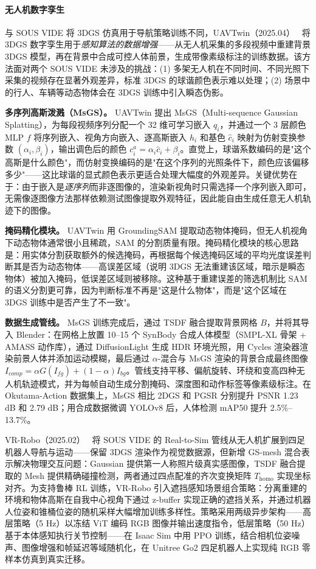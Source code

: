 \paragraph{无人机数字孪生}

与 SOUS VIDE 将 3DGS 仿真用于导航策略训练不同，UAVTwin（2025.04）~\cite{2504_02158} 将 3DGS 数字孪生用于\emph{感知算法的数据增强}——从无人机采集的多段视频中重建背景 3DGS 模型，再在背景中合成可控人体前景，生成带像素级标注的训练数据。该方法面对两个 SOUS VIDE 未涉及的挑战：(1) 多架无人机在不同时间、不同光照下采集的视频存在显著外观差异，标准 3DGS 的球谐颜色表示难以处理；(2) 场景中的行人、车辆等动态物体会在 3DGS 训练中引入瞬态伪影。

\textbf{多序列高斯泼溅（MsGS）。}
UAVTwin 提出 MsGS（Multi-sequence Gaussian Splatting），为每段视频序列分配一个 32 维可学习嵌入 $q_i$，并通过一个 3 层颜色 MLP $f$ 将序列嵌入、视角方向嵌入、逐高斯嵌入 $h_i$ 和基色 $\hat{c}_i$ 映射为仿射变换参数 $(\alpha_i, \beta_i)$，输出调色后的颜色 $c_i^a = \alpha_i \hat{c}_i + \beta_i$。直觉上，球谐系数编码的是"这个高斯是什么颜色"，而仿射变换编码的是"在这个序列的光照条件下，颜色应该偏移多少"——这比球谐的显式颜色表示更适合处理大幅度的外观差异。关键优势在于：由于嵌入是\emph{逐序列}而非逐图像的，渲染新视角时只需选择一个序列嵌入即可，无需像逐图像方法那样依赖测试图像提取外观特征，因此能自由生成任意无人机轨迹下的图像。

\textbf{掩码精化模块。}
UAVTwin 用 GroundingSAM 提取动态物体掩码，但无人机视角下动态物体通常很小且稀疏，SAM 的分割质量有限。掩码精化模块的核心思路是：用实体分割获取额外的候选掩码，再根据每个候选掩码区域的平均光度误差判断其是否为动态物体——高误差区域（说明 3DGS 无法重建该区域，暗示是瞬态物体）被加入掩码，低误差区域则被移除。这种基于重建误差的筛选机制比 SAM 的语义分割更可靠，因为判断标准不再是"这是什么物体"，而是"这个区域在 3DGS 训练中是否产生了不一致"。

\textbf{数据生成管线。}
MsGS 训练完成后，通过 TSDF 融合提取背景网格 $B$，并将其导入 Blender：在网格上放置 10--15 个 SynBody 合成人体模型（SMPL-XL 骨架 + AMASS 动作库），通过 DiffusionLight 生成 HDR 环境光照，用 Cycles 渲染器渲染前景人体并添加运动模糊，最后通过 $\alpha$-混合与 MsGS 渲染的背景合成最终图像 $I_{comp} = \alpha G(I_{fg}) + (1-\alpha)I_{bg}$。管线支持平移、偏航旋转、环绕和变高四种无人机轨迹模式，并为每帧自动生成分割掩码、深度图和动作标签等像素级标注。在 Okutama-Action 数据集上，MsGS 相比 2DGS 和 PGSR 分别提升 PSNR 1.23 dB 和 2.79 dB；用合成数据微调 YOLOv8 后，人体检测 mAP50 提升 2.5\%--13.7\%。

VR-Robo（2025.02）~\cite{2502_01536} 将 SOUS VIDE 的 Real-to-Sim 管线从无人机扩展到四足机器人导航与运动——保留 3DGS 渲染作为视觉数据源，但新增 GS-mesh 混合表示解决物理交互问题：Gaussian 提供第一人称照片级真实感图像，TSDF 融合提取的 Mesh 提供精确碰撞检测，两者通过四点配准的齐次变换矩阵 $T_\text{homo}$ 实现坐标对齐。为支持鲁棒 RL 训练，VR-Robo 引入遮挡感知场景组合策略：分离重建的环境和物体高斯在自我中心视角下通过 z-buffer 实现正确的遮挡关系，并通过机器人位姿和锥桶位姿的随机采样大幅增加训练多样性。策略采用两级异步架构——高层策略（5 Hz）以冻结 ViT 编码 RGB 图像并输出速度指令，低层策略（50 Hz）基于本体感知执行关节控制——在 Isaac Sim 中用 PPO 训练，结合相机位姿噪声、图像增强和帧延迟等域随机化，在 Unitree Go2 四足机器人上实现纯 RGB 零样本仿真到真实迁移。

